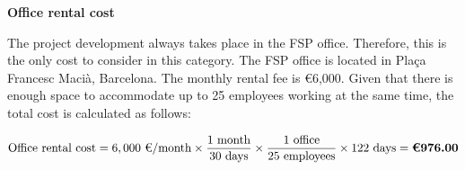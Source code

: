 \vspace{10pt}

\textbf{Office rental cost}

The project development always takes place in the FSP office. Therefore, this is the only cost to consider in this category. The FSP office is located in Plaça Francesc Macià, Barcelona. The monthly rental fee is €6,000. Given that there is enough space to accommodate up to 25 employees working at the same time, the total cost is calculated as follows:
    
\vspace{-25pt}

\[
\text{Office rental cost} = 
6,000 \text{ €/month} \times 
\dfrac{1 \text{ month}}{30 \text{ days}} \times 
\dfrac{1 \text{ office}}{25 \text{ employees}} \times 
122 \text{ days} = 
\textbf{\text{€}976.00}
\]


\vspace{-5pt}


